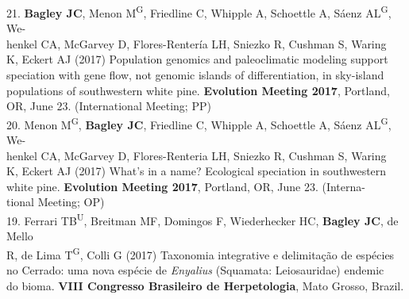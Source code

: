 \documentclass[margin,line]{res}
\begin{document}
\begin{resume}
21. \textbf{Bagley JC}, Menon M\textsuperscript{G}, Friedline C, Whipple A, Schoettle A, S\'{a}enz AL\textsuperscript{G}, We-\\
\hspace*{8mm} henkel CA, McGarvey D, Flores-Renter\'{i}a LH, Sniezko R, Cushman S, Waring\\
\hspace*{8mm} K, Eckert AJ (2017) Population genomics and paleoclimatic modeling support\\
\hspace*{8mm} speciation with gene flow, not genomic islands of differentiation, in sky-island\\
\hspace*{8mm} populations of southwestern white pine. \textbf{Evolution Meeting 2017}, Portland,\\ \vspace{2mm}
\hspace*{8mm}OR, June 23. (International Meeting; PP) \\
20. Menon M\textsuperscript{G}, \textbf{Bagley JC}, Friedline C, Whipple A, Schoettle A, S\'{a}enz AL\textsuperscript{G}, We-\\
\hspace*{8mm} henkel CA, McGarvey D, Flores-Renteria LH, Sniezko R, Cushman S, Waring\\
\hspace*{8mm} K, Eckert AJ (2017) What's in a name? Ecological speciation in southwestern\\
\hspace*{8mm} white pine. \textbf{Evolution Meeting 2017}, Portland, OR, June 23. (Interna-\\ \vspace{2mm}
\hspace*{8mm}tional Meeting; OP) \\
19. Ferrari TB\textsuperscript{U}, Breitman MF, Domingos F, Wiederhecker HC, \textbf{Bagley JC}, de Mello\\
\hspace*{8mm} R, de Lima T\textsuperscript{G}, Colli G (2017) Taxonomia integrative e delimita\c{c}\~{a}o de esp\'{e}cies\\
\hspace*{8mm} no Cerrado: uma nova esp\'{e}cie de \emph{Enyalius} (Squamata: Leiosauridae) endemic\\
\hspace*{8mm} do bioma. \textbf{VIII Congresso Brasileiro de Herpetologia}, Mato Grosso, Brazil.\\ \vspace{2mm} 

\end{resume}
\end{document}
